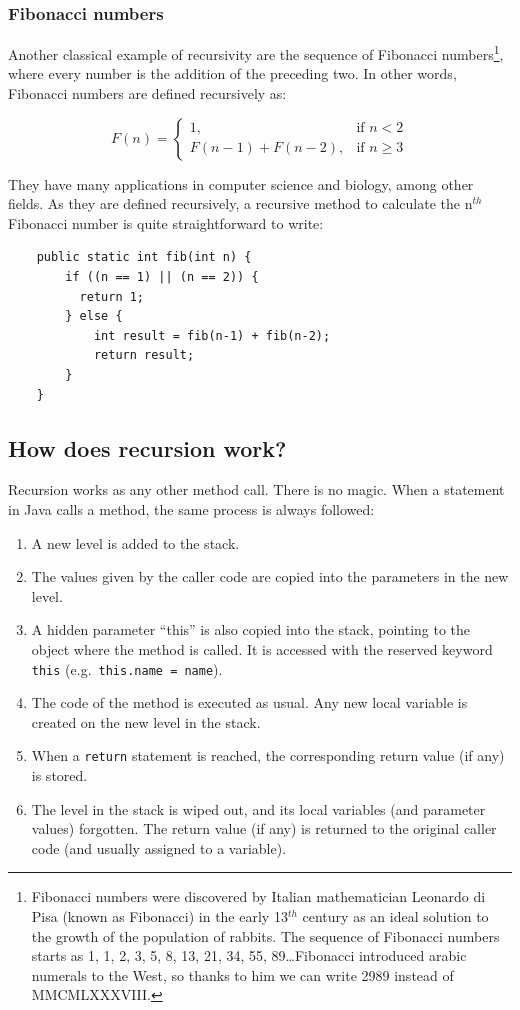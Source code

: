 \subsubsection{Fibonacci numbers}

Another classical example of recursivity are the sequence of Fibonacci
numbers\footnote{Fibonacci numbers were discovered by Italian mathematician
Leonardo di Pisa (known as Fibonacci) in the early 13$^{th}$ century
as an ideal solution to the growth of the population of rabbits. The
sequence of Fibonacci numbers starts as 1, 1, 2, 3, 5, 8, 13, 21, 34,
55, 89\ldots Fibonacci introduced arabic numerals to the West, so
thanks to him we can write 2989 instead of MMCMLXXXVIII.}, where every
number is the addition of the preceding two. 
In other words, Fibonacci numbers are defined recursively as:

$$ F(n) = 
  \begin{cases} 
    1,               & \mbox{if } n < 2 \\ 
    F(n-1) + F(n-2), & \mbox{if } n \ge 3
  \end{cases}
$$

They have many applications in computer science and biology, among
other fields. As they are defined recursively, a recursive method to
calculate the n$^{th}$ Fibonacci number is quite straightforward to
write: 

\begin{verbatim}
    public static int fib(int n) {
        if ((n == 1) || (n == 2)) {
          return 1; 
        } else {
            int result = fib(n-1) + fib(n-2);
            return result;
        }
    }
\end{verbatim}

\subsection{How does recursion work?}
\label{sec:how-does-recursion}

Recursion works as any other method call. There is no magic. When a
statement in Java calls a method, the same process is always 
followed: 

\begin{enumerate}
\item A new level is added to the stack.
\item The values given by the caller code are copied into the
  parameters in the new level.
\item A hidden parameter ``this'' is also copied into the stack,
  pointing to the object where the method is called. It is accessed
  with the reserved keyword \verb+this+ (e.g.~\verb+this.name = name+).
\item The code of the method is executed as usual. Any new local
  variable is created on the new level in the stack. 
\item When a \verb+return+ statement is reached, the corresponding
  return value (if any) is stored.
\item The level in the stack is wiped out, and its local variables
  (and parameter values) forgotten. The return value (if any) is
  returned to the original caller code (and usually assigned to a
  variable).
\end{enumerate}

